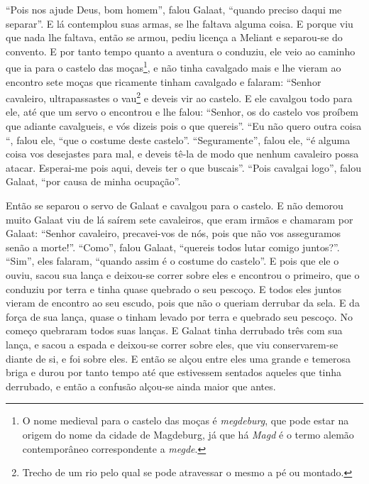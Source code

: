 “Pois nos ajude Deus, bom homem”, falou Galaat, “quando preciso daqui me
separar”. E lá contemplou suas armas, se lhe faltava alguma coisa. E porque viu
que nada lhe faltava, então se armou, pediu licença a Meliant e separou-se do
convento. E por tanto tempo quanto a aventura o conduziu, ele veio ao caminho
que ia para o castelo das moças\footnote{ O nome medieval para o castelo das
moças é \textit{megdeburg}, que pode estar na origem do nome da cidade de
Magdeburg, já que há \textit{Magd} é o termo alemão contemporâneo
correspondente a \textit{megde}. }, e não tinha cavalgado mais e lhe vieram
ao encontro sete moças que ricamente tinham cavalgado e falaram: “Senhor
cavaleiro, ultrapassastes o vau\footnote{ Trecho de um rio pelo qual se pode
atravessar o mesmo a pé ou montado.}  e deveis vir ao castelo. E
ele cavalgou todo para ele, até que um servo o encontrou e lhe falou: “Senhor,
os do castelo vos proíbem que adiante cavalgueis, e vós dizeis pois o que
quereis”. “Eu não quero outra coisa “, falou ele, “que o costume deste
castelo”. “Seguramente”, falou ele, “é alguma coisa vos desejastes para mal, e
deveis tê-la de modo que nenhum cavaleiro possa atacar. Esperai-me pois aqui,
deveis ter o que buscais”. “Pois cavalgai logo”, falou Galaat, “por causa de
minha ocupação”.

Então se separou o servo de Galaat e cavalgou para o castelo. E não demorou
muito Galaat viu de lá saírem sete cavaleiros, que eram irmãos e chamaram por
Galaat: “Senhor cavaleiro, precavei-vos de nós, pois que não vos asseguramos
senão a morte!”. “Como”, falou Galaat, “quereis todos lutar comigo juntos?”.
“Sim”, eles falaram, “quando assim é o costume do castelo”. E pois que ele o
ouviu, sacou sua lança e deixou-se correr sobre eles e encontrou o primeiro,
que o conduziu por terra e tinha quase quebrado o seu pescoço. E todos eles
juntos vieram de encontro ao seu escudo, pois que não o queriam derrubar da
sela. E da força de sua lança, quase o tinham levado por terra e quebrado seu
pescoço. No começo quebraram todos suas lanças. E Galaat tinha derrubado três
com sua lança, e sacou a espada e deixou-se correr sobre eles, que viu
conservarem-se diante de si, e foi sobre eles. E então se alçou entre eles uma
grande e temerosa briga e durou por tanto tempo até que estivessem sentados
aqueles que tinha derrubado, e então a confusão alçou-se ainda maior que antes.



